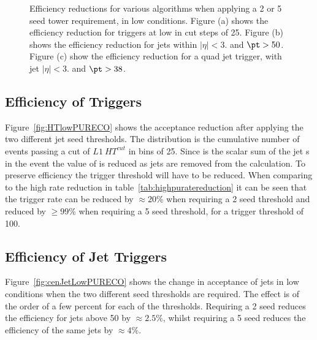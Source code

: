 \begin{figure}[h!]
    \centering
     \newline
    \caption{Efficiency reductions for various \Lone algorithms when applying a 
    2 or \unit{5}{\GeV} seed tower requirement, in low \pu 
    conditions. Figure (a) shows the efficiency reduction for \HT triggers at 
    low \pu in cut steps of \unit{25}{\GeV}. Figure (b) 
    shows the efficiency reduction for jets within $|\eta| <3.$ and $\pt > 
    50$\GeV. Figure (c) show the efficiency reduction for a quad jet trigger, 
    with jet $|\eta| <3.$ and $\pt > 38$\GeV.}
    \label{fig:lowpuratereductionRECO}
\end{figure}



\subsection{Efficiency of \HT Triggers} %
\label{par:Efficneicy of HT triggers}
Figure~\ref{fig:HTlowPURECO} shows the acceptance reduction after applying the two different jet seed thresholds. The distribution is the cumulative number of events passing a cut of $L1~HT^{cut}$ in bins of \unit{25}{\GeV}. Since \HT is the scalar sum of the jet \PT s in the event the value of \Lone \HT is reduced as jets are removed from the calculation. To preserve efficiency the \Lone trigger threshold will have to be reduced. When comparing to the high \pu rate reduction in table~\ref{tab:highpuratereduction} it can be seen that the trigger rate can be reduced by $\approx 20\%$ when requiring a \unit{2}{\GeV} seed threshold and reduced by $\geq 99\%$ when requiring a \unit{5}{\GeV} seed threshold, for a trigger threshold of \unit{100}{\GeV}.


\subsection{Efficiency of Jet Triggers} %
\label{par:Efficiency of Jet Triggers}
Figure~\ref{fig:cenJetLowPURECO} shows the change in acceptance of jets in low \pu conditions when the two different seed thresholds are required. The effect is of the order of a few percent for each of the thresholds. Requiring a \unit{2}{\GeV} seed reduces the efficiency for jets above \unit{50}{\GeV} by $\approx 2.5\%$, whilst requiring a \unit{5}{\GeV} seed reduces the efficiency of the same jets by $\approx 4\%$.

